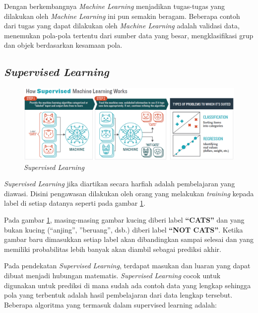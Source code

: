 Dengan berkembangnya \textit{Machine Learning} menjadikan tugas-tugas yang dilakukan oleh \textit{Machine Learning} ini pun semakin beragam.
Beberapa contoh dari tugas yang dapat dilakukan oleh \textit{Machine Learning} adalah validasi data, menemukan pola-pola tertentu dari sumber data yang besar, mengklasifikasi grup dan objek berdasarkan kesamaan pola.
  
  \subsection{\textit{Supervised Learning}}

    \begin{figure}[hbt!] \centering
      \includegraphics[scale=0.3]{gambar/supervised.png}
      \caption{\textit{Supervised Learning} \cite{booz}}
      \label{fig:supervisedLearning}
    \end{figure}

  \textit{Supervised Learning} jika diartikan secara harfiah adalah pembelajaran yang diawasi.
  Disini pengawasan dilakukan oleh orang yang melakukan \textit{training} kepada label di setiap datanya seperti pada gambar \ref{fig:supervisedLearning}.

  Pada gambar \ref{fig:supervisedLearning}, masing-masing gambar kucing diberi label \textbf{“CATS”} dan yang bukan kucing (“anjing”, ”beruang”, dsb.) diberi label \textbf{“NOT CATS”}.
  Ketika gambar baru dimasukkan setiap label akan dibandingkan sampai selesai dan yang memiliki probabilitas lebih banyak akan diambil sebagai prediksi akhir.

  Pada pendekatan \textit{Supervised Learning}, terdapat masukan dan luaran yang dapat dibuat menjadi hubungan matematis.
  \textit{Supervised Learning} cocok untuk digunakan untuk prediksi di mana sudah ada contoh data yang lengkap sehingga pola yang terbentuk adalah hasil pembelajaran dari data lengkap tersebut.
  Beberapa algoritma yang termasuk dalam supervised learning adalah:

